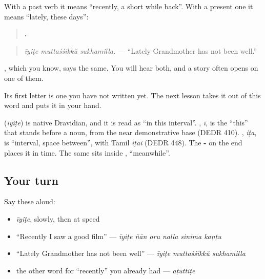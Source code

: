 With a past verb it means \textquotedblleft{}recently, a short while back\textquotedblright{}. With a present one it means \textquotedblleft{}lately, these days\textquotedblright{}:

\begin{quote}
\textbf{  .}
\end{quote}

\begin{quote}
\emph{īyiṭe muttaśśikkŭ sukhamilla.} — \textquotedblleft{}Lately Grandmother has not been well.\textquotedblright{}
\end{quote}

\textbf{}, which you know, says the same. You will hear both, and a story often opens on one of them.

Its first letter is one you have not written yet. The next lesson takes it out of this word and puts it in your hand.

\begin{cousinweb}
\textbf{} (\emph{īyiṭe}) is native Dravidian, and it is read as \textquotedblleft{}in this interval\textquotedblright{}. \textbf{}, \emph{ī}, is the \textquotedblleft{}this\textquotedblright{} that stands before a noun, from the near demonstrative base (DEDR 410). \textbf{}, \emph{iṭa}, is \textquotedblleft{}interval, space between\textquotedblright{}, with Tamil \emph{iṭai} (DEDR 448). The \textbf{-} on the end places it in time. The same \textbf{} sits inside \textbf{}, \textquotedblleft{}meanwhile\textquotedblright{}.
\end{cousinweb}

\subsection*{Your turn}
Say these aloud:

\begin{itemize}
\raggedright
  \item \emph{īyiṭe}, slowly, then at speed
  \item \textquotedblleft{}Recently I saw a good film\textquotedblright{} — \emph{īyiṭe ñān oru nalla sinima kaṇṭu}
  \item \textquotedblleft{}Lately Grandmother has not been well\textquotedblright{} — \emph{īyiṭe muttaśśikkŭ sukhamilla}
  \item the other word for \textquotedblleft{}recently\textquotedblright{} you already had — \emph{aṭuttiṭe}
\end{itemize}

